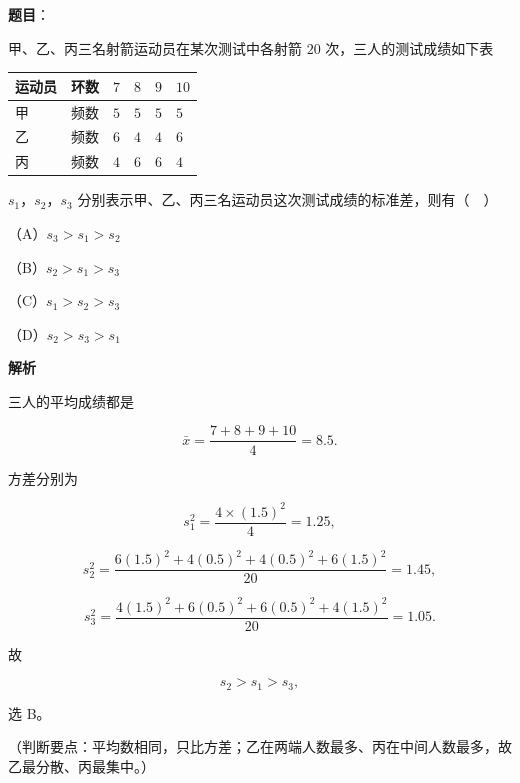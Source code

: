 \begin{answer}

\textbf{题目}：

甲、乙、丙三名射箭运动员在某次测试中各射箭 $20$ 次，三人的测试成绩如下表

\begin{center}
\begin{tabular}{llllll}
\toprule
运动员 & 环数 & $7$ & $8$ & $9$ & $10$ \\
\midrule
甲 & 频数 & $5$ & $5$ & $5$ & $5$ \\
乙 & 频数 & $6$ & $4$ & $4$ & $6$ \\
丙 & 频数 & $4$ & $6$ & $6$ & $4$ \\
\bottomrule
\end{tabular}
\end{center}

$s_1$，$s_2$，$s_3$ 分别表示甲、乙、丙三名运动员这次测试成绩的标准差，则有（　）

（A）$s_3>s_1>s_2$

（B）$s_2>s_1>s_3$

（C）$s_1>s_2>s_3$

（D）$s_2>s_3>s_1$

\textbf{解析}

三人的平均成绩都是

\nopagebreak[4]
\[\bar x=\frac{7+8+9+10}{4}=8.5.\]

方差分别为

\nopagebreak[4]
\[s_1^2=\frac{4\times(1.5)^2}{4}=1.25,\]

\nopagebreak[4]
\[s_2^2=\frac{6(1.5)^2+4(0.5)^2+4(0.5)^2+6(1.5)^2}{20}=1.45,\]

\nopagebreak[4]
\[s_3^2=\frac{4(1.5)^2+6(0.5)^2+6(0.5)^2+4(1.5)^2}{20}=1.05.\]

故

\nopagebreak[4]
\[s_2>s_1>s_3,\]

选 B。

（判断要点：平均数相同，只比方差；乙在两端人数最多、丙在中间人数最多，故乙最分散、丙最集中。）


\end{answer}
